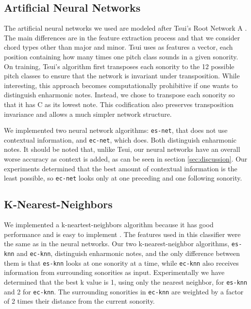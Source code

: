 \documentclass{article}
\begin{document}
\subsection{Artificial Neural Networks}
\label{sec:neural-net}


The artificial neural networks we used are modeled after Tsui's Root
Network A \cite{tsui:harmonic}. The main differences are in the
feature extraction process and that we consider chord types other than
major and minor. Tsui uses as features a vector, each position
containing how many times one pitch class sounds in a given
sonority. On training, Tsui's algorithm first transposes each sonority
to the 12 possible pitch classes to ensure that the network is
invariant under transposition. While interesting, this approach
becomes computationally prohibitive if one wants to distinguish
enharmonic notes. Instead, we chose to transpose each sonority so that
it has C as its lowest note. This codification also preserves
transposition invariance and allows a much simpler network structure.

We implemented two neural network algorithms: \texttt{es-net}, that
does not use contextual information, and \texttt{ec-net}, which
does. Both distinguish enharmonic notes.  It should be noted that,
unlike Tsui, our neural networks have an overall worse accuracy as
context is added, as can be seen in section \ref{sec:discussion}. Our
experiments determined that the best amount of contextual information
is the least possible, so \texttt{ec-net} looks only at one preceding
and one following sonority.


\subsection{K-Nearest-Neighbors}
\label{sec:knn}

We implemented a k-neartest-neighbors algorithm because it has good
performance and is easy to implement \cite{fix.ea:important,
  gomez.ea:estimating}. The features used in this classifier were the
same as in the neural networks. Our two k-nearest-neighbor algorithms,
\texttt{es-knn} and \texttt{ec-knn}, distinguish enharmonic notes, and
the only difference between them is that \texttt{es-knn} looks at one
sonority at a time, while \texttt{ec-knn} also receives information
from surrounding sonorities as input. Experimentally we have
determined that the best k value is 1, using only the nearest
neighbor, for \texttt{es-knn} and 2 for \texttt{ec-knn}. The
surrounding sonorities in \texttt{ec-knn} are weighted by a factor of
2 times their distance from the current sonority.
\end{document}
